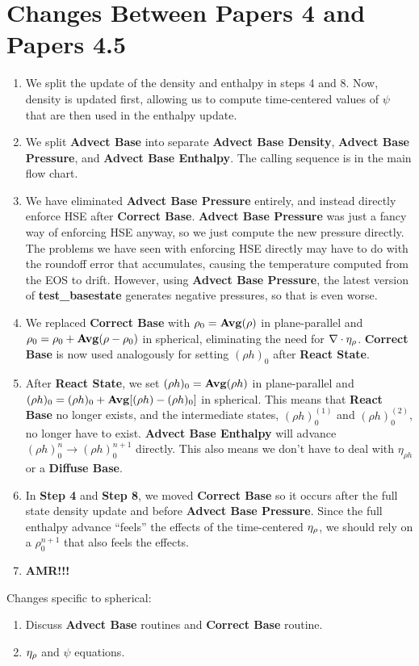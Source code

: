 \section{Changes Between Papers 4 and Papers 4.5}
\begin{enumerate}
\item We split the update of the density and enthalpy in steps 4 and 8.
Now, density is updated first, allowing us to compute time-centered values of 
$\psi$ that are then used in the enthalpy update.
\item We split {\bf Advect Base} into separate {\bf Advect Base Density},
{\bf Advect Base Pressure}, and {\bf Advect Base Enthalpy}.  The calling sequence
is in the main flow chart.
\item We have eliminated {\bf Advect Base Pressure} entirely, and instead directly
enforce HSE after {\bf Correct Base}.  {\bf Advect Base Pressure} was just a fancy
way of enforcing HSE anyway, so we just compute the new pressure directly.  The
problems we have seen with enforcing HSE directly may have to do with the roundoff
error that accumulates, causing the temperature computed from the EOS to drift.
However, using {\bf Advect Base Pressure}, the latest version of {\bf test\_basestate}
generates negative pressures, so that is even worse.
\item We replaced {\bf Correct Base} with $\rho_0 = {\rm{\bf Avg}}(\rho)$ in 
plane-parallel and $\rho_0 = \rho_0 + {\rm{\bf Avg}}(\rho - \rho_0)$ in spherical,
eliminating the need for $\nabla\cdot\eta_{\rho}$.  {\bf Correct Base} is now used
analogously for setting $(\rho h)_0$ after {\bf React State}.
\item After {\bf React State}, we set $(\rho h)_0 = {\rm{\bf Avg}}(\rho h)$ in 
plane-parallel and $(\rho h)_0 = (\rho h)_0 + {\rm{\bf Avg}}[(\rho h) - (\rho h)_0]$ 
in spherical.  This means that {\bf React Base} no longer exists, and the intermediate 
states, $(\rho h)_0^{(1)}$ and $(\rho h)_0^{(2)}$, no longer have to exist.  
{\bf Advect Base Enthalpy} will advance $(\rho h)_0^n \rightarrow (\rho h)_0^{n+1}$ 
directly.  This also means we don't have to deal with $\eta_{\rho h}$ or a 
{\bf Diffuse Base}.
\item In {\bf Step 4} and {\bf Step 8}, we moved {\bf Correct Base} so it
occurs after the full state density update and  before {\bf Advect Base Pressure}.  
Since the full enthalpy advance ``feels'' the effects of the time-centered $\eta_{\rho}$, 
we should rely on a $\rho_0^{n+1}$ that also feels the effects.
\item {\bf AMR!!!}
\end{enumerate}
Changes specific to spherical:
\begin{enumerate}
\item Discuss {\bf Advect Base} routines and {\bf Correct Base} routine.
\item $\eta_{\rho}$ and $\psi$ equations.
\end{enumerate}
